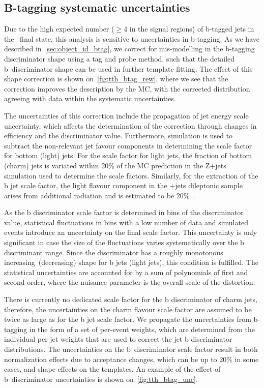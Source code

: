 \subsection{B-tagging systematic uncertainties}
\label{sec:btag_unc}
Due to the high expected number ($\geq4$ in the signal regions) of b-tagged jets in the~\ttHbb\xspace final state, this analysis is sensitive to uncertainties in b-tagging. As we have described in~\cref{sec:object_id_btag}, we correct for mis-modelling in the b-tagging discriminator shape using a tag and probe method, such that the detailed b~discriminator shape can be used in further template fitting. The effect of this shape correction is shown on~\cref{fig:tth_btag_rew}, where we see that the correction improves the description by the MC, with the corrected distribution agreeing with data within the systematic uncertainties.

The uncertainties of this correction include the propagation of jet energy scale uncertainty, which affects the determination of the correction through changes in efficiency and the discriminator value. Furthermore, simulation is used to subtract the non-relevant jet favour components in determining the scale factor for bottom (light) jets. For the scale factor for light jets, the fraction of bottom (charm) jets is variated within 20\% of the MC prediction in the Z+jets simulation used to determine the scale factors. Similarly, for the extraction of the b jet scale factor, the light flavour component in the \ttbar+jets dileptonic sample arises from additional radiation and is estimated to be 20\%~\cite{CMS-PAS-BTV-15-001}.

As the b discriminator scale factor is determined in bins of the discriminator value, statistical fluctuations in bins with a low number of data and simulated events introduce an uncertainty on the final scale factor. This uncertainty is only significant in case the size of the fluctuations varies systematically over the b discriminant range. Since the discriminator has a roughly monotonous increasing (decreasing) shape for b jets (light jets), this condition is fulfilled. The statistical uncertainties are accounted for by a sum of polynomials of first and second order, where the nuisance parameter is the overall scale of the distortion.

There is currently no dedicated scale factor for the b discriminator of charm jets, therefore, the uncertainties on the charm flavour scale factor are assumed to be twice as large as for the b jet scale factor. We propagate the uncertainties from b-tagging in the form of a set of per-event weights, which are determined from the individual per-jet weights that are used to correct the jet b discriminator distributions. The uncertainties on the b~discriminator scale factor result in both normalization effects due to acceptance changes, which can be up to 20\% in some cases, and shape effects on the templates. An example of the effect of b~discriminator uncertainties is shown on~\cref{fig:tth_btag_unc}. 


